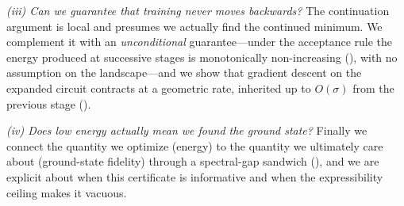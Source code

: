 \documentclass[11pt]{article}
\theoremstyle{plain}
\theoremstyle{plain}
\begin{document}
\emph{(iii) Can we guarantee that training never moves backwards?}  The
continuation argument is local and presumes we actually find the
continued minimum.  We complement it with an \emph{unconditional}
guarantee---under the acceptance rule the energy produced at successive
stages is monotonically non-increasing (), with no
assumption on the landscape---and we show that gradient descent on the
expanded circuit contracts at a geometric rate, inherited up to
$O(\sigma)$ from the previous stage ().

\emph{(iv) Does low energy actually mean we found the ground state?}
Finally we connect the quantity we optimize (energy) to the quantity we
ultimately care about (ground-state fidelity) through a spectral-gap
sandwich (), and we are explicit about when this
certificate is informative and when the expressibility ceiling makes it
vacuous.
\end{document}
